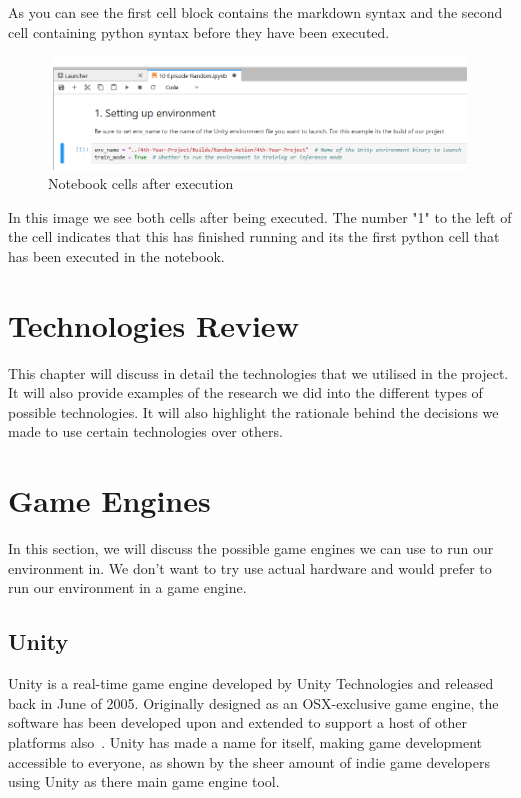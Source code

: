 \begin{flushleft}
As you can see the first cell block contains the markdown syntax and the second cell containing python syntax before they have been executed.
\end{flushleft}

\begin{figure}[H]
    \centering
    \includegraphics[width=115mm, height=30mm]{img/Notebook2.PNG}
    \caption{Notebook cells after execution}
    \label{fig:sd4}
\end{figure}

\begin{flushleft}
In this image we see both cells after being executed. The number "1" to the left of the cell indicates that this has finished running and its the first python cell that has been executed in the notebook. 
\end{flushleft}


\section{Technologies Review}
This chapter will discuss in detail the technologies that we utilised in the project. It will also provide examples of the research we did into the different types of possible technologies. It will also highlight the rationale behind the decisions we made to use certain technologies over others.

\section{Game Engines}
In this section, we will discuss the possible game engines we can use to run our environment in. We don't want to try use actual hardware and would prefer to run our environment in a game engine.

\subsection{Unity}
Unity is a real-time game engine developed by Unity Technologies and released back in June of 2005. Originally designed as an OSX-exclusive game engine, the software has been developed upon and extended to support a host of other platforms also~\cite{unityWebsite}. Unity has made a name for itself, making game development accessible to everyone, as shown by the sheer amount of indie game developers using Unity as there main game engine tool.

